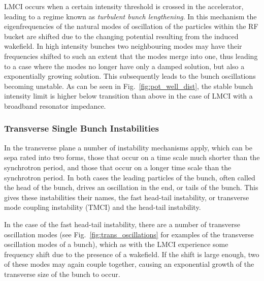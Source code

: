 LMCI occurs when a certain intensity threshold is crossed in the accelerator, leading to a regime known as \emph{turbulent bunch lengthening}. In this mechanism the eigenfrequencies of the natural modes of oscillation of the particles within the RF bucket are shifted due to the changing potential resulting from the induced wakefield. In high intensity bunches two neighbouring modes may have their frequencies shifted to such an extent that the modes merge into one, thus leading to a case where the modes no longer have only a damped solution, but also a exponentially growing solution. This subsequently leads to the bunch oscillations becoming unstable. As can be seen in Fig.~\ref{fig:pot_well_dist}, the stable bunch intensity limit is higher below transition than above in the case of LMCI with a broadband resonator impedance.

\subsubsection{Transverse Single Bunch Instabilities}

In the transverse plane a number of instability mechanisms apply, which can be sepa
rated into two forms, those that occur on a time scale much shorter than the synchrotron period, and those that occur on a longer time scale than the synchrotron period. In both cases the leading particles of the bunch, often called the head of the bunch, drives an oscillation in the end, or tails of the bunch. This gives these instabilities their names, the fast head-tail instability, or transverse mode coupling instability (TMCI) and the head-tail instability.

In the case of the fast head-tail instability, there are a number of transverse oscillation modes (see Fig.~\ref{fig:trans_oscillations} for examples of the transverse oscillation modes of a bunch), which as with the LMCI experience some frequency shift due to the presence of a wakefield. If the shift is large enough, two of these modes may again couple together, causing an exponential growth of the transverse size of the bunch to occur.

